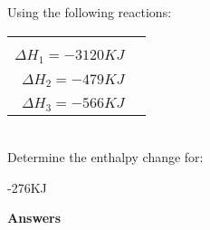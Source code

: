 \documentclass[main.tex]{subfiles}
\begin{document}
\begin{multicols*}{2}
\begin{question}[ID=\the\value{numA}]
Using the following reactions:\\
\begin{tabularx}{\columnwidth}{>{}m{.65\linewidth} *{2}{Y} }
   \\
   \\
    \\
   \\
    \\
   \\
    \\
\end{tabularx}\\
Determine the enthalpy change for:
\begin{center}\end{center}\end{question}

\begin{solution}
-276KJ
 \hspace{0.1cm}\end{solution}




\end{multicols*}
\newpage
\begin{answersenvironment}
\begin{minipage}[c]{1\textwidth}
\begin{localsize}{10}
{\Large \bf Answers}
\printsolutions[byID={1,3,5,7,9,11,13,15,17,19,21,23,25 }]
\end{localsize}
\end{minipage}\end{answersenvironment}
\end{document}
